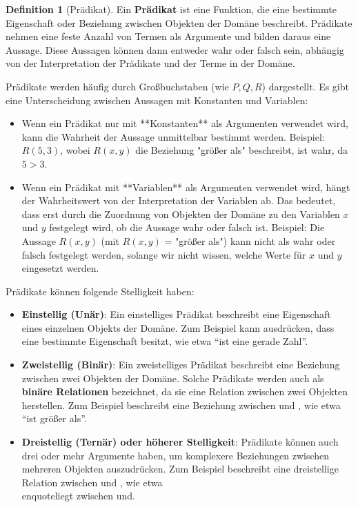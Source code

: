 \documentclass{book}
\theoremstyle{plain}
\theoremstyle{remark}
\theoremstyle{definition}
\newtheorem{definition}{Definition}[section]
\begin{document}
\begin{definition}[Prädikat]
Ein \textbf{Prädikat} ist eine Funktion, die eine bestimmte Eigenschaft oder Beziehung zwischen Objekten der Domäne beschreibt. Prädikate nehmen eine feste Anzahl von Termen als Argumente und bilden daraus eine Aussage. Diese Aussagen können dann entweder wahr oder falsch sein, abhängig von der Interpretation der Prädikate und der Terme in der Domäne.

Prädikate werden häufig durch Großbuchstaben (wie \(P, Q, R\)) dargestellt. Es gibt eine Unterscheidung zwischen Aussagen mit Konstanten und Variablen:

\begin{itemize}
    \item Wenn ein Prädikat nur mit **Konstanten** als Argumenten verwendet wird, kann die Wahrheit der Aussage unmittelbar bestimmt werden. Beispiel: \(R(5, 3)\), wobei \(R(x, y)\) die Beziehung "größer als" beschreibt, ist wahr, da \(5 > 3\).
    
    \item Wenn ein Prädikat mit **Variablen** als Argumenten verwendet wird, hängt der Wahrheitswert von der Interpretation der Variablen ab. Das bedeutet, dass erst durch die Zuordnung von Objekten der Domäne zu den Variablen \(x\) und \(y\) festgelegt wird, ob die Aussage wahr oder falsch ist. Beispiel: Die Aussage \(R(x, y)\) (mit \(R(x, y)\) = "größer als") kann nicht als wahr oder falsch festgelegt werden, solange wir nicht wissen, welche Werte für \(x\) und \(y\) eingesetzt werden.
\end{itemize}

Prädikate können folgende Stelligkeit haben:
\begin{itemize}
\item 	\textbf{Einstellig (Unär)}: Ein einstelliges Prädikat beschreibt eine Eigenschaft eines einzelnen Objekts der Domäne. Zum Beispiel kann  ausdrücken, dass  eine bestimmte Eigenschaft besitzt, wie etwa \enquote{ist eine gerade Zahl}.
\item 	\textbf{Zweistellig (Binär)}: Ein zweistelliges Prädikat beschreibt eine Beziehung zwischen zwei Objekten der Domäne. Solche Prädikate werden auch als \textbf{binäre Relationen} bezeichnet, da sie eine Relation zwischen zwei Objekten herstellen. Zum Beispiel beschreibt  eine Beziehung zwischen  und , wie etwa \enquote{ist größer als}.

\item 	\textbf{Dreistellig (Ternär) oder höherer Stelligkeit}: Prädikate können auch drei oder mehr Argumente haben, um komplexere Beziehungen zwischen mehreren Objekten auszudrücken. Zum Beispiel beschreibt  eine dreistellige Relation zwischen  und , wie etwa \\enquote{liegt zwischen  und}.
\end{itemize}


\end{definition}
\end{document}

